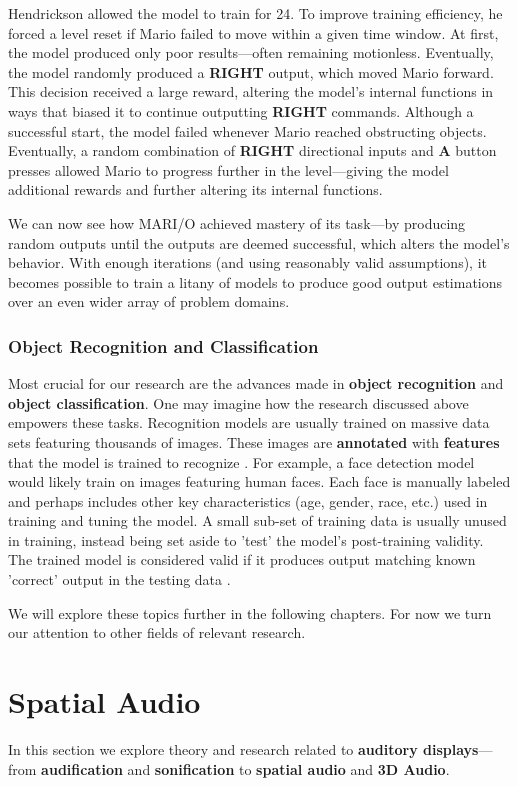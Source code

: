 \documentclass{report}
\newcommand{\tech}[1]{\textbf{#1}}
\begin{document}
Hendrickson allowed the model to train for 24. To improve training efficiency, he forced a level reset if Mario failed to move within a given time window. At first, the model produced only poor results---often remaining motionless. Eventually, the model randomly produced a \tech{RIGHT} output, which moved Mario forward. This decision received a large reward, altering the model's internal functions in ways that biased it to continue outputting \tech{RIGHT} commands. Although a successful start, the model failed whenever Mario reached obstructing objects. Eventually, a random combination of \tech{RIGHT} directional inputs and \tech{A} button presses allowed Mario to progress further in the level---giving the model additional rewards and further altering its internal functions. 

We can now see how MARI/O achieved mastery of its task---by producing random outputs until the outputs are deemed successful, which alters the model's behavior. With enough iterations (and using reasonably valid assumptions), it becomes possible to train a litany of models to produce good output estimations over an even wider array of problem domains.  

\subsubsection{Object Recognition and Classification}
Most crucial for our research are the advances made in \tech{object recognition} and \tech{object classification}. One may imagine how the research discussed above empowers these tasks. Recognition models are usually trained on massive data sets featuring thousands of images. These images are \tech{annotated} with \tech{features} that the model is trained to recognize \cite{wang2016deep}. For example, a face detection model would likely train on images featuring human faces. Each face is manually labeled and perhaps includes  other key characteristics (age, gender, race, etc.) used in training and tuning the model. A small sub-set of training data is usually unused in training, instead being set aside to 'test' the model's post-training validity. The trained model is considered valid if it produces output matching known 'correct' output in the testing data \cite{zhao2019objectdetectiondeeplearning}. 

We will explore these topics further in the following chapters. For now we turn our attention to other fields of relevant research. 

\section{Spatial Audio}
In this section we explore theory and research related to \tech{auditory displays}---from \tech{audification} and \tech{sonification} to \tech{spatial audio} and \tech{3D Audio}.
\end{document}
